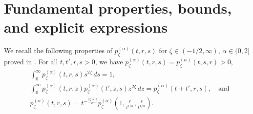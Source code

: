 \documentclass[12pt,reqno,a4paper]{amsart}
\theoremstyle{definition}
\theoremstyle{remark}
\numberwithin{equation}{section}
\newcommand{\1}{\mathbbm{1}}
\begin{document}
\section{Fundamental properties, bounds, and explicit expressions}
\label{s:elementaryproperties}


We recall the following properties of $p_\zeta^{(\alpha)}(t,r,s)$ for $\zeta\in(-1/2,\infty)$, $\alpha\in(0,2]$ proved in \cite[Section~2]{BogdanMerz2024}. For all $t,t',r,s>0$, we have $p_\zeta^{(\alpha)}(t,r,s)=p_\zeta^{(\alpha)}(t,s,r)>0$,
\begin{align}
  \label{eq:normalizedalpha}
  & \int_0^\infty p_\zeta^{(\alpha)}(t,r,s) s^{2\zeta}\,ds = 1, \\
  \label{eq:chapman}
  & \int_0^\infty p_\zeta^{(\alpha)}(t,r,z) p_\zeta^{(\alpha)}(t',z,s) z^{2\zeta}\,dz = p_\zeta^{(\alpha)}(t+t',r,s), \quad \text{and} \\
  \label{eq:scalingalpha}
  & p_\zeta^{(\alpha)}(t,r,s) = t^{-\frac{2\zeta+1}{\alpha}} p_\zeta^{(\alpha)}\left(1,\frac{r}{t^{1/\alpha}},\frac{s}{t^{1/\alpha}}\right).
\end{align}
\end{document}
